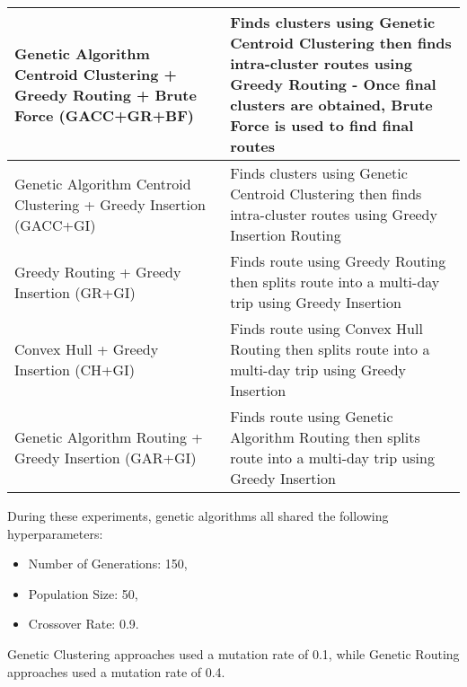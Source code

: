 \begin{center}
\begin{longtable}[H]{| p{6cm} | p{9cm} |}
        \hline
        Genetic Algorithm Centroid Clustering + Greedy Routing + Brute Force (GACC+GR+BF) & Finds clusters using Genetic
        Centroid Clustering then finds intra-cluster routes using Greedy Routing - Once final clusters are obtained,
        Brute Force is used to find final routes \\
        \hline
        Genetic Algorithm Centroid Clustering + Greedy Insertion (GACC+GI) & Finds clusters using Genetic Centroid
        Clustering then finds intra-cluster routes using Greedy Insertion Routing \\
        \hline
        Greedy Routing + Greedy Insertion (GR+GI) & Finds route using Greedy Routing then splits route into a multi-day
        trip using Greedy Insertion \\
        \hline
        Convex Hull + Greedy Insertion (CH+GI) & Finds route using Convex Hull Routing then splits route into a
        multi-day trip using Greedy Insertion \\
        \hline
        Genetic Algorithm Routing + Greedy Insertion (GAR+GI) & Finds route using Genetic Algorithm Routing then splits
        route into a multi-day trip using Greedy Insertion \\
        \hline
    \end{longtable}
\end{center}

During these experiments, genetic algorithms all shared the following hyperparameters:
\begin{itemize}
    \item Number of Generations: 150,
    \item Population Size: 50,
    \item Crossover Rate: 0.9.
\end{itemize}
Genetic Clustering approaches used a mutation rate of 0.1, while Genetic Routing approaches used a mutation rate of 0.4.

